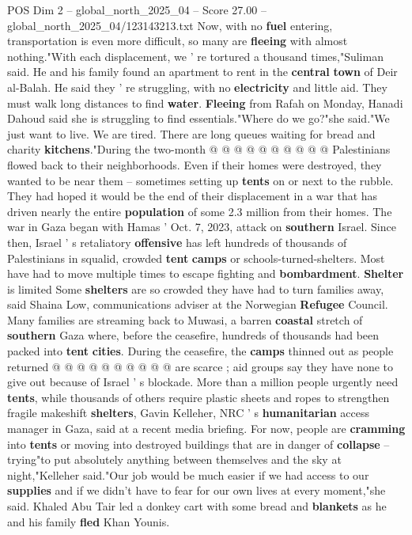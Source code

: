 \begin{textsample}{POS Dim 2 – global\_north\_2025\_04 – Score 27.00 – global\_north\_2025\_04/123143213.txt}
Now, with no \textbf{fuel} entering, transportation is even more difficult, so many are \textbf{fleeing} with almost nothing."With each displacement, we ' re tortured a thousand times,"Suliman said.
He and his family found an apartment to rent in the \textbf{central} \textbf{town} of Deir al-Balah.
He said they ' re struggling, with no \textbf{electricity} and little aid.
They must walk long distances to find \textbf{water}. \textbf{Fleeing} from Rafah on Monday, Hanadi Dahoud said she is struggling to find essentials."Where do we go?"she said."We just want to live.
We are tired.
There are long queues waiting for bread and charity \textbf{kitchens}."During the two-month @ @ @ @ @ @ @ @ @ @ Palestinians flowed back to their neighborhoods.
Even if their homes were destroyed, they wanted to be near them -- sometimes setting up \textbf{tents} on or next to the rubble.
They had hoped it would be the end of their displacement in a war that has driven nearly the entire \textbf{population} of some 2.3 million from their homes.
The war in Gaza began with Hamas ' Oct. 7, 2023, attack on \textbf{southern} Israel.
Since then, Israel ' s retaliatory \textbf{offensive} has left hundreds of thousands of Palestinians in squalid, crowded \textbf{tent} \textbf{camps} or schools-turned-shelters.
Most have had to move multiple times to escape fighting and \textbf{bombardment}. \textbf{Shelter} is limited Some \textbf{shelters} are so crowded they have had to turn families away, said Shaina Low, communications adviser at the Norwegian \textbf{Refugee} Council.
Many families are streaming back to Muwasi, a barren \textbf{coastal} stretch of \textbf{southern} Gaza where, before the ceasefire, hundreds of thousands had been packed into \textbf{tent} \textbf{cities}.
During the ceasefire, the \textbf{camps} thinned out as people returned @ @ @ @ @ @ @ @ @ @ are scarce ; aid groups say they have none to give out because of Israel ' s blockade.
More than a million people urgently need \textbf{tents}, while thousands of others require plastic sheets and ropes to strengthen fragile makeshift \textbf{shelters}, Gavin Kelleher, NRC ' s \textbf{humanitarian} access manager in Gaza, said at a recent media briefing.
For now, people are \textbf{cramming} into \textbf{tents} or moving into destroyed buildings that are in danger of \textbf{collapse} -- trying"to put absolutely anything between themselves and the sky at night,"Kelleher said."Our job would be much easier if we had access to our \textbf{supplies} and if we didn't have to fear for our own lives at every moment,"she said.
Khaled Abu Tair led a donkey cart with some bread and \textbf{blankets} as he and his family \textbf{fled} Khan Younis.

\end{textsample}

